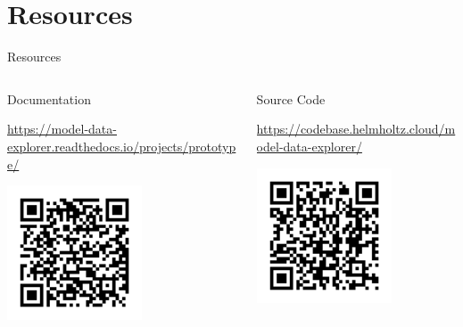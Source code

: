 
\section{Resources} \label{sec:resources}

\begin{frame}[t]{Resources}

    \begin{columns}[T]
        \begin{column}{0.5\textwidth}
            \begin{block}{Documentation}
                \begin{small}
                    \url{https://model-data-explorer.readthedocs.io/projects/prototype/} \\
                \end{small}
                \href{https://model-data-explorer.readthedocs.io/projects/prototype/}{
                    \includegraphics[width=4cm]{figures/qrcode-rtd-prototype.png}
                }
            \end{block}
        \end{column}
        \begin{column}{0.45\textwidth}
            \begin{block}{Source Code}
                \begin{small}
                    \url{https://codebase.helmholtz.cloud/model-data-explorer/} \\
                \end{small}
                \href{https://codebase.helmholtz.cloud/model-data-explorer/}{
                    \includegraphics[width=4cm]{figures/qrcode-gitlab.png}
                }
            \end{block}
        \end{column}
    \end{columns}


\end{frame}
